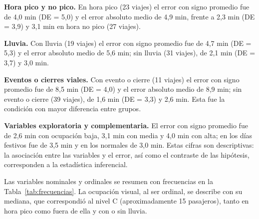 \textbf{Hora pico y no pico.} En hora pico (23 viajes) el error con signo promedio fue de 4,0 min (DE = 5,0) y el error absoluto medio de 4,9 min, frente a 2,3 min (DE = 3,9) y 3,1 min en hora no pico (27 viajes).

\textbf{Lluvia.} Con lluvia (19 viajes) el error con signo promedio fue de 4,7 min (DE = 5,3) y el error absoluto medio de 5,6 min; sin lluvia (31 viajes), de 2,1 min (DE = 3,7) y 3,0 min.

\textbf{Eventos o cierres viales.} Con evento o cierre (11 viajes) el error con signo promedio fue de 8,5 min (DE = 4,0) y el error absoluto medio de 8,9 min; sin evento o cierre (39 viajes), de 1,6 min (DE = 3,3) y 2,6 min. Esta fue la condición con mayor diferencia entre grupos.

\textbf{Variables exploratoria y complementaria.} El error con signo promedio fue de 2,6 min con ocupación baja, 3,1 min con media y 4,0 min con alta; en los días festivos fue de 3,5 min y en los normales de 3,0 min. Estas cifras son descriptivas: la asociación entre las variables y el error, así como el contraste de las hipótesis, corresponden a la estadística inferencial.

Las variables nominales y ordinales se resumen con frecuencias en la Tabla~\ref{tab:frecuencias}. La ocupación visual, al ser ordinal, se describe con su mediana, que correspondió al nivel C (aproximadamente 15 pasajeros), tanto en hora pico como fuera de ella y con o sin lluvia.

